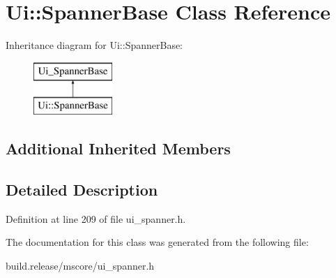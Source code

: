 \hypertarget{class_ui_1_1_spanner_base}{}\section{Ui\+:\+:Spanner\+Base Class Reference}
\label{class_ui_1_1_spanner_base}
Inheritance diagram for Ui\+:\+:Spanner\+Base\+:\begin{figure}[H]
\begin{center}
\leavevmode
\includegraphics[height=2.000000cm]{class_ui_1_1_spanner_base}
\end{center}
\end{figure}
\subsection*{Additional Inherited Members}


\subsection{Detailed Description}


Definition at line 209 of file ui\+\_\+spanner.\+h.



The documentation for this class was generated from the following file\+:\begin{DoxyCompactItemize}
\item 
build.\+release/mscore/ui\+\_\+spanner.\+h\end{DoxyCompactItemize}
